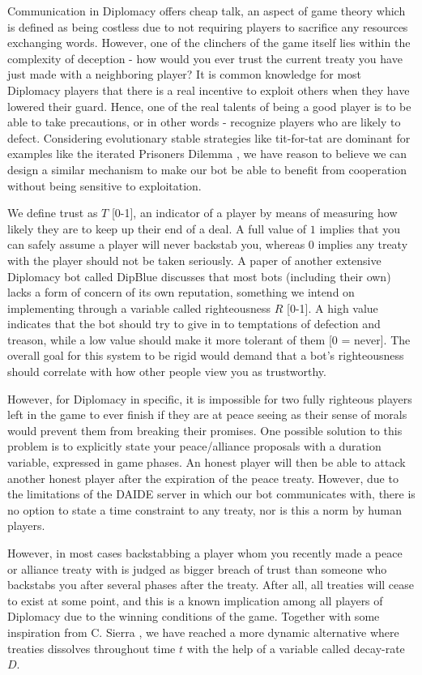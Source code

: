 \documentclass[a4paper]{article} %
\begin{document}
Communication in Diplomacy offers cheap talk, an aspect of game theory which is defined as being costless due to not requiring players to sacrifice any resources exchanging words. However, one of the clinchers of the game itself lies within the complexity of deception - how would you ever trust the current treaty you have just made with a neighboring player? It is common knowledge for most Diplomacy players that there is a real incentive to exploit others when they have lowered their guard. Hence, one of the real talents of being a good player is to be able to take precautions, or in other words - recognize players who are likely to defect. Considering evolutionary stable strategies like tit-for-tat are dominant for examples like the iterated Prisoners Dilemma \cite{dilemmas}, we have reason to believe we can design a similar mechanism to make our bot be able to benefit from cooperation without being sensitive to exploitation.

We define trust as $T$ [0-1], an indicator of a player by means of measuring how likely they are to keep up their end of a deal. A full value of $1$ implies that you can safely assume a player will never backstab you, whereas $0$ implies any treaty with the player should not be taken seriously. A paper of another extensive Diplomacy bot called DipBlue \cite{dipblue} discusses that most bots (including their own) lacks a form of concern of its own reputation, something we intend on implementing through a variable called righteousness $R$ [0-1]. A high value indicates that the bot should try to give in to temptations of defection and treason, while a low value should make it more tolerant of them [0 = never]. The overall goal for this system to be rigid would demand that a bot's righteousness should correlate with how other people view you as trustworthy.

However, for Diplomacy in specific, it is impossible for two fully righteous players left in the game to ever finish if they are at peace seeing as their sense of morals would prevent them from breaking their promises. One possible solution to this problem is to explicitly state your peace/alliance proposals with a duration variable, expressed in game phases. An honest player will then be able to attack another honest player after the expiration of the peace treaty. However, due to the limitations of the DAIDE server in which our bot communicates with, there is no option to state a time constraint to any treaty, nor is this a norm by human players.

However, in most cases backstabbing a player whom you recently made a peace or alliance treaty with is judged as bigger breach of trust than someone who backstabs you after several phases after the treaty. After all, all treaties will cease to exist at some point, and this is a known implication among all players of Diplomacy due to the winning conditions of the game. Together with some inspiration from C. Sierra \cite{trust}, we have reached a more dynamic alternative where treaties dissolves throughout time $t$ with the help of a variable called decay-rate $D$.
\end{document}
